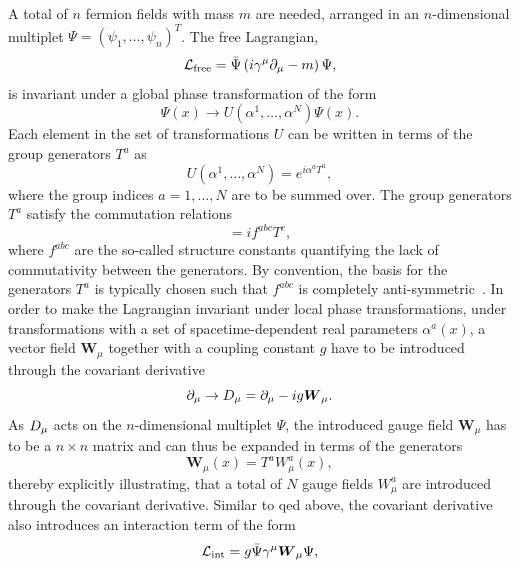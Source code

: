 A total of $n$ fermion fields with mass $m$ are needed, arranged in an $n$-dimensional multiplet $\Psi = (\psi_1,\dots,\psi_n)^T$. The free Lagrangian,
\begin{equation}
	\mathcal{L}_\mathrm{free} = \bar{\Psi}\left(i\gamma^\mu\partial_\mu -m\right)\Psi,
	\label{eq:free_lagrangian}
\end{equation}
is invariant under a global phase transformation of the form
\begin{equation}
	\Psi(x) \rightarrow U(\alpha^1,\dots,\alpha^N)\Psi(x).
\end{equation}
Each element in the set of transformations $U$ can be written in terms of the group generators $T^a$ as
\begin{equation}
	U(\alpha^1,\dots,\alpha^N) = e^{i\alpha^aT^a},
\end{equation}
where the group indices $a = 1,\dots,N$ are to be summed over. The group generators $T^a$ satisfy the commutation relations
\begin{equation}
	[T^a,T^b] = i f^{abc}T^c,
\end{equation}
where $f^{abc}$ are the so-called structure constants quantifying the lack of commutativity between the generators. By convention, the basis for the generators $T^a$ is typically chosen such that $f^{abc}$ is completely anti-symmetric~\cite{Brock:1354959}. In order to make the Lagrangian invariant under local phase transformations, \ie under transformations with a set of spacetime-dependent real parameters $\alpha^a(x)$, a vector field $\boldsymbol{W}_\mu$ together with a coupling constant $g$ have to be introduced through the covariant derivative  
\begin{equation}
	\partial_\mu \rightarrow \mathop{}\!D_\mu = \partial_\mu - ig\boldsymbol{W}_\mu.
\end{equation}
As $\mathop{}\!D_\mu$ acts on the $n$-dimensional multiplet $\Psi$, the introduced gauge field $\boldsymbol{W}_\mu$ has to be a $n\times n$ matrix and can thus be expanded in terms of the generators
\begin{equation}
	\boldsymbol{W}_\mu(x) = T^a W_\mu^a(x),
\end{equation}
thereby explicitly illustrating, that a total of $N$ gauge fields $W^a_\mu$ are introduced through the covariant derivative. Similar to \gls{qed} above, the covariant derivative also introduces an interaction term of the form
\begin{equation}
	\mathcal{L}_\mathrm{int} = g\bar{\Psi}\gamma^\mu\boldsymbol{W}_\mu\Psi,
\end{equation}
